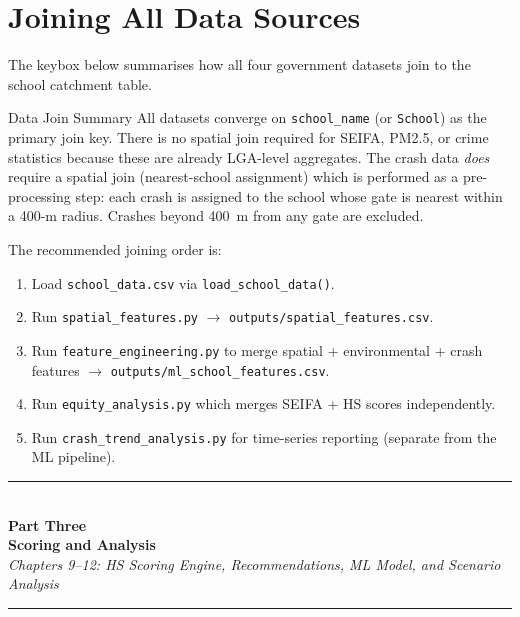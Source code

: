 \documentclass[11pt,a4paper,openany]{book}
\begin{document}
\section{Joining All Data Sources}

The keybox below summarises how all four government datasets join to the school catchment table.

\begin{keybox}{Data Join Summary}
All datasets converge on \texttt{school\_name} (or \texttt{School}) as the primary join key. There is no spatial join required for SEIFA, PM2.5, or crime statistics because these are already LGA-level aggregates. The crash data \emph{does} require a spatial join (nearest-school assignment) which is performed as a pre-processing step: each crash is assigned to the school whose gate is nearest within a 400-m radius. Crashes beyond 400~m from any gate are excluded.
\end{keybox}

The recommended joining order is:

\begin{enumerate}
  \item Load \texttt{school\_data.csv} via \texttt{load\_school\_data()}.
  \item Run \texttt{spatial\_features.py} $\to$ \texttt{outputs/spatial\_features.csv}.
  \item Run \texttt{feature\_engineering.py} to merge spatial + environmental + crash features $\to$ \texttt{outputs/ml\_school\_features.csv}.
  \item Run \texttt{equity\_analysis.py} which merges SEIFA + HS scores independently.
  \item Run \texttt{crash\_trend\_analysis.py} for time-series reporting (separate from the ML pipeline).
\end{enumerate}


\cleardoublepage
\thispagestyle{empty}
\vspace*{\fill}
\begin{center}
{\color{navyblue}\rule{0.75\linewidth}{2pt}}\\[1.2cm]
{\Huge\bfseries\color{navyblue}Part Three}\\[0.6cm]
{\LARGE\bfseries\color{navyblue}Scoring and Analysis}\\[0.6cm]
{\large\itshape Chapters 9--12: HS Scoring Engine, Recommendations, ML Model, and Scenario Analysis}\\[1.2cm]
{\color{regengreen}\rule{0.75\linewidth}{1pt}}
\end{center}
\vspace*{\fill}
\clearpage
\end{document}
